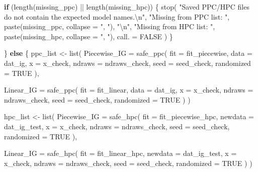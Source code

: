 \documentclass[
  english,
  letterpaper,
  DIV=11,
  numbers=noendperiod]{scrartcl}
\newenvironment{Shaded}{\begin{snugshade}}{\end{snugshade}}
\newcommand{\AttributeTok}[1]{\textcolor[rgb]{0.40,0.45,0.13}{#1}}
\newcommand{\ConstantTok}[1]{\textcolor[rgb]{0.56,0.35,0.01}{#1}}
\newcommand{\ControlFlowTok}[1]{\textcolor[rgb]{0.00,0.23,0.31}{\textbf{#1}}}
\newcommand{\FunctionTok}[1]{\textcolor[rgb]{0.28,0.35,0.67}{#1}}
\newcommand{\NormalTok}[1]{\textcolor[rgb]{0.00,0.23,0.31}{#1}}
\newcommand{\OtherTok}[1]{\textcolor[rgb]{0.00,0.23,0.31}{#1}}
\newcommand{\SpecialCharTok}[1]{\textcolor[rgb]{0.37,0.37,0.37}{#1}}
\newcommand{\StringTok}[1]{\textcolor[rgb]{0.13,0.47,0.30}{#1}}
\begin{document}
\begin{Shaded}
\begin{Highlighting}[]
  \ControlFlowTok{if}\NormalTok{ (}\FunctionTok{length}\NormalTok{(missing\_ppc) }\SpecialCharTok{||} \FunctionTok{length}\NormalTok{(missing\_hpc)) \{}
    \FunctionTok{stop}\NormalTok{(}
      \StringTok{"Saved PPC/HPC files do not contain the expected model names.}\SpecialCharTok{\textbackslash{}n}\StringTok{"}\NormalTok{,}
      \StringTok{"Missing from PPC list: "}\NormalTok{, }\FunctionTok{paste}\NormalTok{(missing\_ppc, }\AttributeTok{collapse =} \StringTok{", "}\NormalTok{), }\StringTok{"}\SpecialCharTok{\textbackslash{}n}\StringTok{"}\NormalTok{,}
      \StringTok{"Missing from HPC list: "}\NormalTok{, }\FunctionTok{paste}\NormalTok{(missing\_hpc, }\AttributeTok{collapse =} \StringTok{", "}\NormalTok{),}
      \AttributeTok{call. =} \ConstantTok{FALSE}
\NormalTok{    )}
\NormalTok{  \}}

\NormalTok{\} }\ControlFlowTok{else}\NormalTok{ \{}
\NormalTok{  ppc\_list }\OtherTok{\textless{}{-}} \FunctionTok{list}\NormalTok{(}
    \AttributeTok{Piecewise\_IG =} \FunctionTok{safe\_ppc}\NormalTok{(}
      \AttributeTok{fit =}\NormalTok{ fit\_piecewise,}
      \AttributeTok{data =}\NormalTok{ dat\_ig,}
      \AttributeTok{x =}\NormalTok{ x\_check,}
      \AttributeTok{ndraws =}\NormalTok{ ndraws\_check,}
      \AttributeTok{seed =}\NormalTok{ seed\_check,}
      \AttributeTok{randomized =} \ConstantTok{TRUE}
\NormalTok{    ),}

    \AttributeTok{Linear\_IG =} \FunctionTok{safe\_ppc}\NormalTok{(}
      \AttributeTok{fit =}\NormalTok{ fit\_linear,}
      \AttributeTok{data =}\NormalTok{ dat\_ig,}
      \AttributeTok{x =}\NormalTok{ x\_check,}
      \AttributeTok{ndraws =}\NormalTok{ ndraws\_check,}
      \AttributeTok{seed =}\NormalTok{ seed\_check,}
      \AttributeTok{randomized =} \ConstantTok{TRUE}
\NormalTok{    )}
\NormalTok{  )}

\NormalTok{  hpc\_list }\OtherTok{\textless{}{-}} \FunctionTok{list}\NormalTok{(}
    \AttributeTok{Piecewise\_IG =} \FunctionTok{safe\_hpc}\NormalTok{(}
      \AttributeTok{fit =}\NormalTok{ fit\_piecewise\_hpc,}
      \AttributeTok{newdata =}\NormalTok{ dat\_ig\_test,}
      \AttributeTok{x =}\NormalTok{ x\_check,}
      \AttributeTok{ndraws =}\NormalTok{ ndraws\_check,}
      \AttributeTok{seed =}\NormalTok{ seed\_check,}
      \AttributeTok{randomized =} \ConstantTok{TRUE}
\NormalTok{    ),}

    \AttributeTok{Linear\_IG =} \FunctionTok{safe\_hpc}\NormalTok{(}
      \AttributeTok{fit =}\NormalTok{ fit\_linear\_hpc,}
      \AttributeTok{newdata =}\NormalTok{ dat\_ig\_test,}
      \AttributeTok{x =}\NormalTok{ x\_check,}
      \AttributeTok{ndraws =}\NormalTok{ ndraws\_check,}
      \AttributeTok{seed =}\NormalTok{ seed\_check,}
      \AttributeTok{randomized =} \ConstantTok{TRUE}
\NormalTok{    )}
\NormalTok{  )}


\end{Highlighting}
\end{Shaded}
\end{document}
